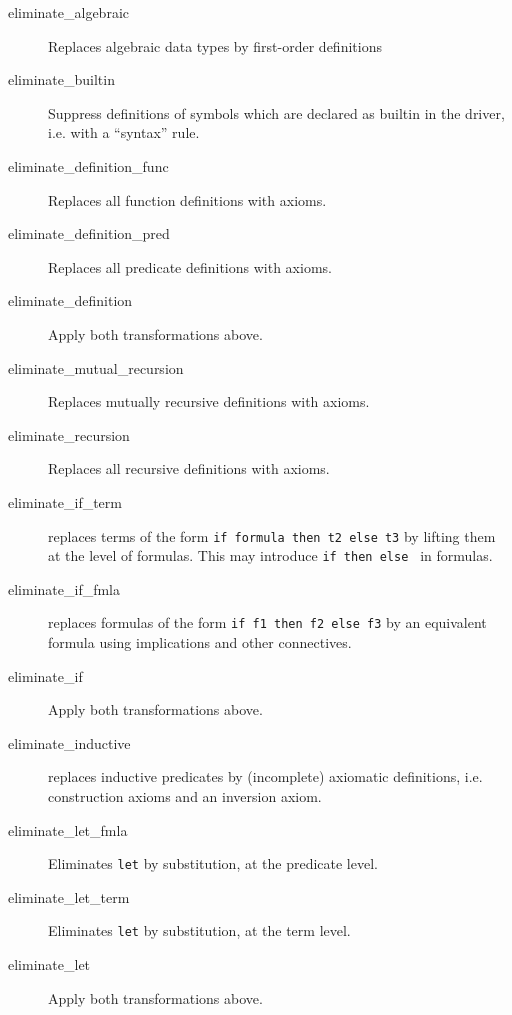 \begin{description}

\item[eliminate\_algebraic] Replaces algebraic data types by first-order
definitions~\cite{paskevich09rr}

\item[eliminate\_builtin] Suppress definitions of symbols which are
  declared as builtin in the driver, i.e. with a ``syntax'' rule.
\item[eliminate\_definition\_func]
  Replaces all function definitions with axioms.
\item[eliminate\_definition\_pred]
  Replaces all predicate definitions with axioms.
\item[eliminate\_definition]
  Apply both transformations above.
\item[eliminate\_mutual\_recursion]
  Replaces mutually recursive definitions with axioms.
\item[eliminate\_recursion]
  Replaces all recursive definitions with axioms.

\item[eliminate\_if\_term] replaces terms of the form \texttt{if
    formula then t2 else t3} by lifting them at the level of formulas.
  This may introduce \texttt{if then else } in formulas.

\item[eliminate\_if\_fmla] replaces formulas of the form \texttt{if f1 then f2
  else f3} by an equivalent formula using implications and other
  connectives. 

\item[eliminate\_if]
  Apply both transformations above.

\item[eliminate\_inductive] replaces inductive predicates by
  (incomplete) axiomatic definitions, i.e. construction axioms and
  an inversion axiom.

\item[eliminate\_let\_fmla]
  Eliminates \texttt{let} by substitution, at the predicate level.

\item[eliminate\_let\_term]
  Eliminates \texttt{let} by substitution, at the term level.

\item[eliminate\_let]
  Apply both transformations above.




\end{description}
